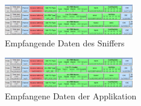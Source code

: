
\begin{figure}[ht]
    \includegraphics[width=0.5\textwidth]{4Resultate/imag/sniffer.png} 
    \caption{Empfangende Daten des Sniffers}
    \label{sniffer}
\end{figure}

\begin{figure}[ht]
    \includegraphics[width=0.5\textwidth]{4Resultate/imag/sniffer.png} 
    \caption{Empfangene Daten der Applikation}
    \label{applikation_daten}
\end{figure}








